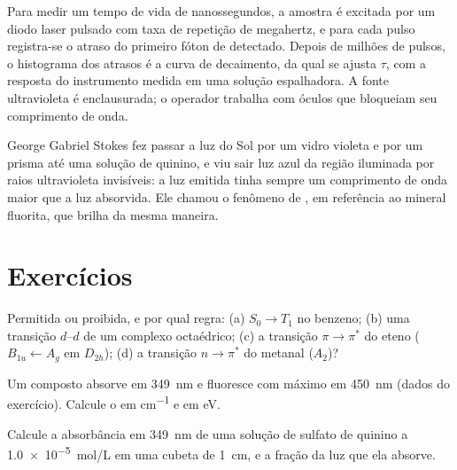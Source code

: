 \begin{inthelab}
Para medir um tempo de vida de nanossegundos, a amostra é excitada por um
diodo laser pulsado com taxa de repetição de megahertz, e para cada pulso
registra-se o atraso do primeiro fóton de  detectado. Depois de
milhões de pulsos, o histograma dos atrasos é a curva de decaimento, da qual
se ajusta $\tau$, com a resposta do instrumento medida em uma solução
espalhadora. A fonte ultravioleta é enclausurada; o operador trabalha com
óculos que bloqueiam seu comprimento de onda.
\end{inthelab}

\begin{history}[Stokes, 1852]
George Gabriel Stokes fez passar a luz do Sol por um vidro violeta e por um
prisma até uma solução de quinino, e viu sair luz azul da região iluminada por
raios ultravioleta invisíveis: a luz emitida tinha sempre um comprimento de
onda maior que a luz absorvida. Ele chamou o fenômeno de , em
referência ao mineral fluorita, que brilha da mesma maneira.
\end{history}

\section{Exercícios}

\begin{exercise}[$\star$]\label{exo:b3:electronic-spectroscopy:1}
Permitida ou proibida, e por qual regra: (a) $S_0 \to T_1$ no benzeno; (b) uma
transição $d$--$d$ de um complexo octaédrico; (c) a transição $\pi\to\pi^*$ do eteno
($B_{1u} \leftarrow A_g$ em $D_{2h}$); (d) a transição $n\to\pi^*$ do metanal
($A_2$)?
\end{exercise}

\begin{exercise}[$\star$]\label{exo:b3:electronic-spectroscopy:2}
Um composto absorve em \qty{349}{nm} e fluoresce com máximo em
\qty{450}{nm} (dados do exercício). Calcule o  em \unit{cm^{-1}}
e em eV.
\end{exercise}

\begin{exercise}[$\star$]\label{exo:b3:electronic-spectroscopy:3}
Calcule a absorbância em \qty{349}{nm} de uma solução de sulfato de quinino a
\qty{1.0e-5}{mol/L} em uma cubeta de \qty{1}{cm}, e a fração da luz que ela absorve.
\end{exercise}

